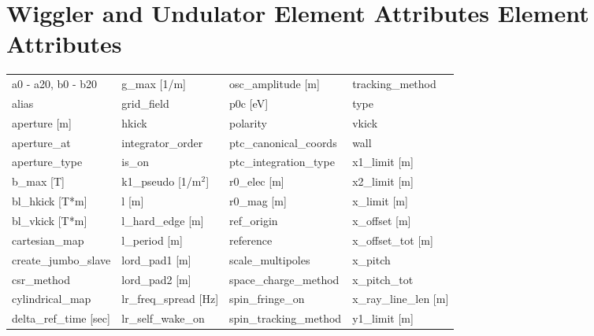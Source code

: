  \section{Wiggler and Undulator Element Attributes Element Attributes}
 \label{s:list.wiggler}

 \begin{tabular}{llll} \toprule
a0 - a20, b0 - b20             & g_max [1/m]                    & osc_amplitude [m]              & tracking_method                \\
alias                          & grid_field                     & p0c [eV]                       & type                           \\
aperture [m]                   & hkick                          & polarity                       & vkick                          \\
aperture_at                    & integrator_order               & ptc_canonical_coords           & wall                           \\
aperture_type                  & is_on                          & ptc_integration_type           & x1_limit [m]                   \\
b_max [T]                      & k1_pseudo [1/m$^2$]            & r0_elec [m]                    & x2_limit [m]                   \\
bl_hkick [T*m]                 & l [m]                          & r0_mag [m]                     & x_limit [m]                    \\
bl_vkick [T*m]                 & l_hard_edge [m]                & ref_origin                     & x_offset [m]                   \\
cartesian_map                  & l_period [m]                   & reference                      & x_offset_tot [m]               \\
create_jumbo_slave             & lord_pad1 [m]                  & scale_multipoles               & x_pitch                        \\
csr_method                     & lord_pad2 [m]                  & space_charge_method            & x_pitch_tot                    \\
cylindrical_map                & lr_freq_spread [Hz]            & spin_fringe_on                 & x_ray_line_len [m]             \\
delta_ref_time [sec]           & lr_self_wake_on                & spin_tracking_method           & y1_limit [m]                   \\

\end{tabular}
